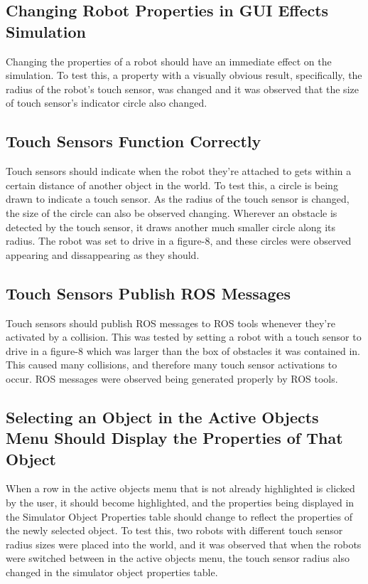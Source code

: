 \subsection{Changing Robot Properties in GUI Effects Simulation}
Changing the properties of a robot should have an immediate effect on the simulation. To test this, a property with a visually obvious result, specifically, the radius of the robot's touch sensor, was changed and it was observed that the size of touch sensor's indicator circle also changed.

\subsection{Touch Sensors Function Correctly}
Touch sensors should indicate when the robot they're attached to gets within a certain distance of another object in the world. To test this, a circle is being drawn to indicate a touch sensor. As the radius of the touch sensor is changed, the size of the circle can also be observed changing. Wherever an obstacle is detected by the touch sensor, it draws another much smaller circle along its radius. The robot was set to drive in a figure-8, and these circles were observed appearing and dissappearing as they should.

\subsection{Touch Sensors Publish ROS Messages}
Touch sensors should publish ROS messages to ROS tools whenever they're activated by a collision. This was tested by setting a robot with a touch sensor to drive in a figure-8 which was larger than the box of obstacles it was contained in. This caused many collisions, and therefore many touch sensor activations to occur. ROS messages were observed being generated properly by ROS tools.

\subsection{Selecting an Object in the Active Objects Menu Should Display the Properties of That Object}
When a row in the active objects menu that is not already highlighted is clicked by the user, it should become highlighted, and the properties being displayed in the Simulator Object Properties table should change to reflect the properties of the newly selected object. To test this, two robots with different touch sensor radius sizes were placed into the world, and it was observed that when the robots were switched between in the active objects menu, the touch sensor radius also changed in the simulator object properties table.


